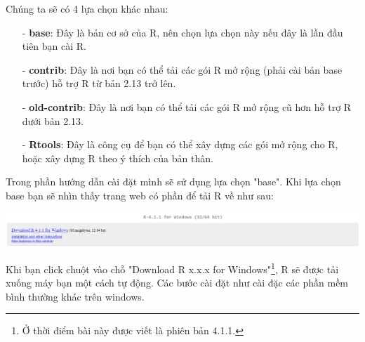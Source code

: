 \documentclass{standalone} %
\begin{document}
        Chúng ta sẽ có 4 lựa chọn khác nhau:
        \begin{itemize}
            \item[-] \textbf{base}: Đây là bản cơ sở của R, nên chọn lựa chọn này nếu đây là lần đầu tiên bạn cài R.
            \item[-] \textbf{contrib}: Đây là nơi bạn có thể tải các gói R mở rộng (phải cài bản base trước) hỗ trợ R từ bản 2.13 trở lên.
            \item[-] \textbf{old-contrib}: Đây là nơi bạn có thể tải các gói R mở rộng cũ hơn hỗ trợ R dưới bản 2.13.
            \item[-] \textbf{Rtools}: Đây là công cụ để bạn có thể xây dựng các gói mở rộng cho R, hoặc xây dựng R theo ý thích của bản thân.
        \end{itemize}
        
        Trong phần hướng dẫn cài đặt mình sẽ sử dụng lựa chọn "base". Khi lựa chọn base bạn sẽ nhìn thấy trang web có phần để tải R về như sau:
        
        \begin{center}
            \includegraphics[width=\textwidth,height=\textheight,keepaspectratio]{Pictures/Download_for _win_2.png}
        \end{center}
        
        Khi bạn click chuột vào chỗ "Download R x.x.x for Windows"\footnote{Ở thời điểm bài này được viết là phiên bản 4.1.1.}, R sẽ được tải xuống máy bạn một cách tự động. Các bước cài đặt như cài đặc các phần mềm bình thường khác trên windows.
        
        
        
        
        
\end{document}
